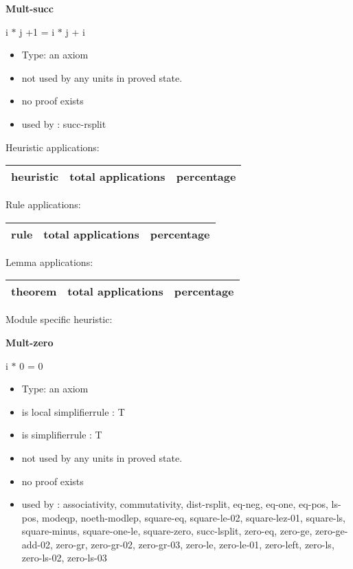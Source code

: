 \documentclass[a4paper]{article}
\begin{document}
\pagebreak

{\LARGE\bf Mult-succ}\label{lemma-Mult-succ}

\medskip

 \Fol i $*$ j +1 = i $*$ j + i

\begin{itemize}

\item Type: an axiom

\item not used by any units in proved state.
\item       no proof exists
\item       used by      : succ-rsplit
\end{itemize}

\medskip


Heuristic applications:

\begin{supertabular}{l|r|r}
heuristic	& total applications & percentage \\ \hline

\end{supertabular}

Rule applications:

\begin{supertabular}{l|r|r}
rule	        & total applications & percentage \\ \hline

\end{supertabular}

Lemma applications:

\begin{supertabular}{l|r|r}
theorem	        & total applications & percentage \\ \hline

\end{supertabular}

Module specific heuristic:

\pagebreak

{\LARGE\bf Mult-zero}\label{lemma-Mult-zero}

\medskip

 \Fol i $*$ 0 = 0

\begin{itemize}

\item Type: an axiom

\item is local simplifierrule : T
\item is simplifierrule : T
\item not used by any units in proved state.
\item       no proof exists
\item       used by      : associativity, commutativity, dist-rsplit, eq-neg, eq-one, eq-pos, ls-pos, modeqp, noeth-modlep, square-eq, square-le-02, square-lez-01, square-ls, square-minus, square-one-le, square-zero, succ-lsplit, zero-eq, zero-ge, zero-ge-add-02, zero-gr, zero-gr-02, zero-gr-03, zero-le, zero-le-01, zero-left, zero-ls, zero-ls-02, zero-ls-03
\end{itemize}
\end{document}
